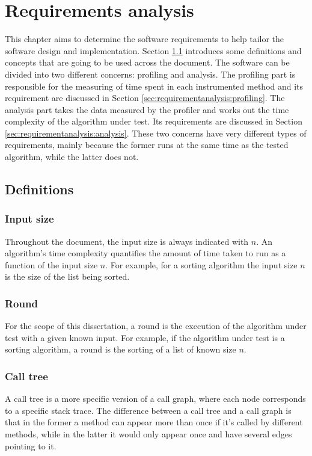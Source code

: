 \chapter{Requirements analysis}

This chapter aims to determine the software requirements to help tailor the software design and implementation. Section \ref{sec:requirementanalysis:definitions} introduces some definitions and concepts that are going to be used across the document. The software can be divided into two different concerns: profiling and analysis. The profiling part is responsible for the measuring of time spent in each instrumented method and its requirement are discussed in Section \ref{sec:requirementanalysis:profiling}. The analysis part takes the data measured by the profiler and works out the time complexity of the algorithm under test. Its requirements are discussed in Section \ref{sec:requirementanalysis:analysis}. These two concerns have very different types of requirements, mainly because the former runs at the same time as the tested algorithm, while the latter does not.

\section{Definitions}
\label{sec:requirementanalysis:definitions}

\subsection{Input size}
Throughout the document, the input size is always indicated with $n$. An algorithm's time complexity quantifies the amount of time taken to run as a function of the input size $n$. For example, for a sorting algorithm the input size $n$ is the size of the list being sorted.

\subsection{Round}
For the scope of this dissertation, a round is the execution of the algorithm under test with a given known input. For example, if the algorithm under test is a sorting algorithm, a round is the sorting of a list of known size $n$.

\subsection{Call tree}
A call tree is a more specific version of a call graph\cite{GKM00}, where each node corresponds to a specific stack trace. The difference between a call tree and a call graph is that in the former a method can appear more than once if it's called by different methods, while in the latter it would only appear once and have several edges pointing to it.


